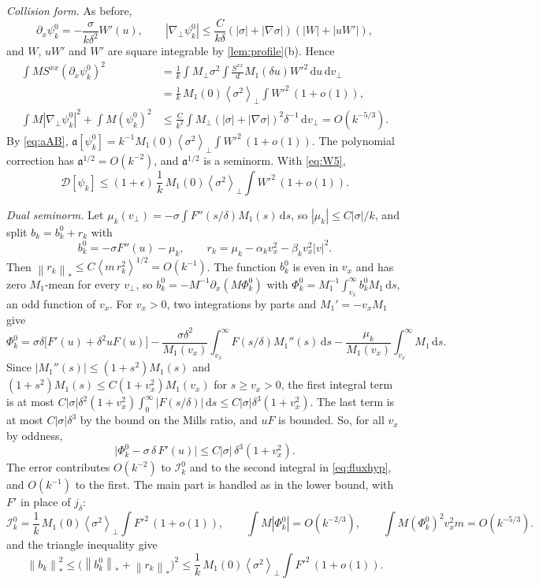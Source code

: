 \documentclass[11pt]{article}
\newcommand{\dd}{\,\mathrm d}
\newcommand{\av}[1]{\left\langle #1\right\rangle}
\newcommand{\D}{\mathcal D}
\newcommand{\nstar}[1]{\left\|#1\right\|_*}
\theoremstyle{definition}
\theoremstyle{remark}
\numberwithin{equation}{section}
\begin{document}
\emph{Collision form.} As before,
\[
 \partial_x\psi_k^0=-\frac{\sigma}{k\delta^2}W'(u),\qquad
 |\nabla_\perp\psi_k^0|\leq\frac{C}{k\delta}(|\sigma|+|\nabla\sigma|)
   (|W|+|uW'|),
\]
and $W$, $uW'$ and $W'$ are square integrable by \cref{lem:profile}(b).
Hence
\begin{align*}
 \int MS^{xx}(\partial_x\psi_k^0)^2
  &=\frac1k\int M_\perp\sigma^2\!\int\frac{S^{xx}}{d}M_1(\delta u)W'^2
   \dd u\dd v_\perp\\
  &=\frac1k\,M_1(0)\av{\sigma^2}_\perp\!\int W'^2\,(1+o(1)),\\
 \int M|\nabla_\perp\psi_k^0|^2+\int M(\psi_k^0)^2
  &\leq\frac{C}{k^2}\int M_\perp(|\sigma|+|\nabla\sigma|)^2\delta^{-1}\dd v_\perp
   =O(k^{-5/3}).
\end{align*}
By \eqref{eq:aAB}, $\mathfrak a[\psi_k^0]=k^{-1}M_1(0)\av{\sigma^2}_\perp
\int W'^2\,(1+o(1))$. The polynomial correction has
$\mathfrak a^{1/2}=O(k^{-2})$, and $\mathfrak a^{1/2}$ is a seminorm.
With \eqref{eq:W5},
\begin{equation}
 \D[\psi_k]\leq(1+\epsilon)\,\frac1k\,M_1(0)\av{\sigma^2}_\perp\!\int W'^2\,(1+o(1)).
 \label{eq:upperD}
\end{equation}

\emph{Dual seminorm.} Let
$\mu_k(v_\perp)=-\sigma\int F''(s/\delta)M_1(s)\dd s$, so
$|\mu_k|\leq C|\sigma|/k$, and split $b_k=b_k^0+r_k$ with
\[
 b_k^0=-\sigma F''(u)-\mu_k,\qquad
 r_k=\mu_k-\alpha_kv_x^2-\beta_kv_x^2|v|^2 .
\]
Then $\nstar{r_k}\leq C\av{m\,r_k^2}^{1/2}=O(k^{-1})$. The function $b_k^0$
is even in $v_x$ and has zero $M_1$-mean for every $v_\perp$, so
$b_k^0=-M^{-1}\partial_x(M\Phi_k^0)$ with
$\Phi_k^0=M_1^{-1}\int_{v_x}^\infty b_k^0M_1\dd s$, an odd function of
$v_x$. For $v_x>0$, two integrations by parts and $M_1'=-v_xM_1$ give
\[
 \Phi_k^0=\sigma\delta\bigl[F'(u)+\delta^2uF(u)\bigr]
  -\frac{\sigma\delta^2}{M_1(v_x)}\int_{v_x}^\infty F(s/\delta)M_1''(s)\dd s
  -\frac{\mu_k}{M_1(v_x)}\int_{v_x}^\infty M_1\dd s .
\]
Since $|M_1''(s)|\leq(1+s^2)M_1(s)$ and
$(1+s^2)M_1(s)\leq C(1+v_x^2)M_1(v_x)$ for $s\geq v_x>0$, the first
integral term is at most
$C|\sigma|\delta^2(1+v_x^2)\int_0^\infty|F(s/\delta)|\dd s
\leq C|\sigma|\delta^3(1+v_x^2)$. The last term is at most
$C|\sigma|\delta^3$ by the bound on the Mills ratio, and $uF$ is bounded.
So, for all $v_x$ by oddness,
\[
 \bigl|\Phi_k^0-\sigma\,\delta\,F'(u)\bigr|\leq C|\sigma|\,\delta^3(1+v_x^2).
\]
The error contributes $O(k^{-2})$ to $\mathcal I_k^0$ and to the second
integral in \eqref{eq:fluxhyp}, and $O(k^{-1})$ to the first. The main
part is handled as in the lower bound, with $F'$ in place of $j_\delta$:
\[
 \mathcal I_k^0=\frac1k\,M_1(0)\av{\sigma^2}_\perp\!\int F'^2\,(1+o(1)),\qquad
 \int M|\Phi_k^0|=O(k^{-2/3}),\qquad
 \int M(\Phi_k^0)^2v_x^2m=O(k^{-5/3}).
\]
 and the triangle inequality give
\[
 \nstar{b_k}^2\leq\bigl(\nstar{b_k^0}+\nstar{r_k}\bigr)^2
 \leq\frac1k\,M_1(0)\av{\sigma^2}_\perp\!\int F'^2\,(1+o(1)).
\]
\end{document}
